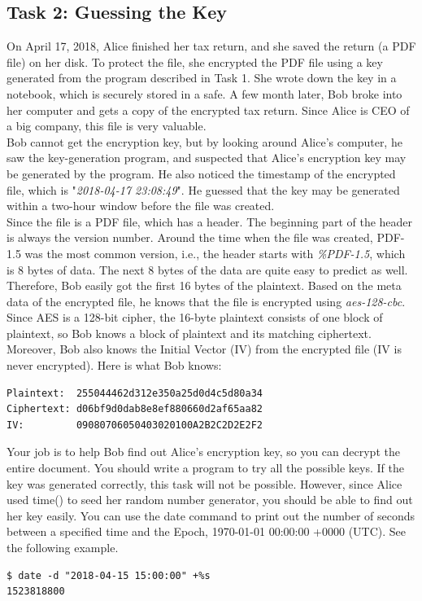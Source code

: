 \documentclass[12pt]{article}
\newcommand\tab[1][0.5cm]{\hspace*{#1}}
\begin{document}
\subsection{Task 2: Guessing the Key}
On April 17, 2018, Alice finished her tax return, and she saved the return (a PDF file) on her disk. To protect
the file, she encrypted the PDF file using a key generated from the program described in Task 1. She wrote
down the key in a notebook, which is securely stored in a safe. A few month later, Bob broke into her
computer and gets a copy of the encrypted tax return. Since Alice is CEO of a big company, this file is very
valuable.\\
\tab Bob cannot get the encryption key, but by looking around Alice’s computer, he saw the key-generation
program, and suspected that Alice’s encryption key may be generated by the program. He also noticed the
timestamp of the encrypted file, which is "\emph{2018-04-17 23:08:49}". He guessed that the key may be
generated within a two-hour window before the file was created.\\
\tab Since the file is a PDF file, which has a header. The beginning part of the header is always the version
number. Around the time when the file was created, PDF-1.5 was the most common version, i.e., the header
starts with \emph{{\%}PDF-1.5}, which is 8 bytes of data. The next 8 bytes of the data are quite easy to predict as
well. Therefore, Bob easily got the first 16 bytes of the plaintext. Based on the meta data of the encrypted
file, he knows that the file is encrypted using \emph{aes-128-cbc}. Since AES is a 128-bit cipher, the 16-byte
plaintext consists of one block of plaintext, so Bob knows a block of plaintext and its matching ciphertext.
Moreover, Bob also knows the Initial Vector (IV) from the encrypted file (IV is never encrypted). Here is
what Bob knows:
\begin{verbatim}
Plaintext:  255044462d312e350a25d0d4c5d80a34
Ciphertext: d06bf9d0dab8e8ef880660d2af65aa82
IV:         09080706050403020100A2B2C2D2E2F2
\end{verbatim}

\tab Your job is to help Bob find out Alice’s encryption key, so you can decrypt the entire document. You
should write a program to try all the possible keys. If the key was generated correctly, this task will not be
possible. However, since Alice used time() to seed her random number generator, you should be able
to find out her key easily. You can use the date command to print out the number of seconds between a
specified time and the Epoch, 1970-01-01 00:00:00 +0000 (UTC). See the following example.
\begin{verbatim}
$ date -d "2018-04-15 15:00:00" +%s
1523818800
\end{verbatim}
\end{document}
